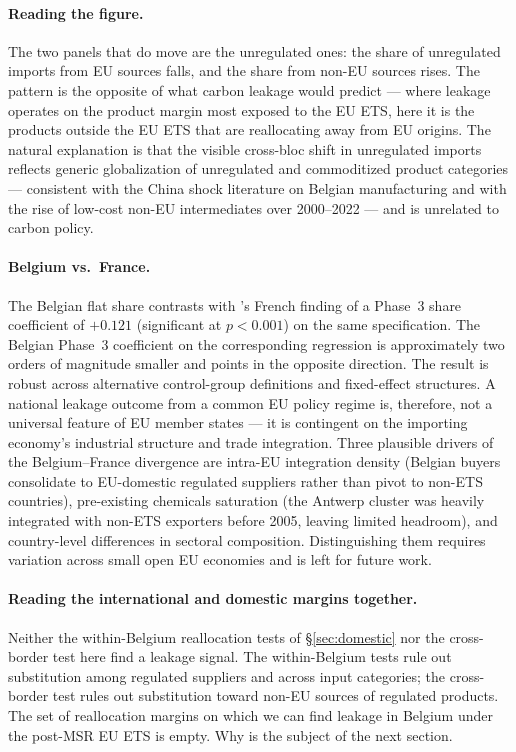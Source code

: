 \paragraph{Reading the figure.} The two panels that do move are the unregulated ones: the share of unregulated imports from EU sources falls, and the share from non-EU sources rises. The pattern is the opposite of what carbon leakage would predict --- where leakage operates on the product margin most exposed to the EU ETS, here it is the products outside the EU ETS that are reallocating away from EU origins. The natural explanation is that the visible cross-bloc shift in unregulated imports reflects generic globalization of unregulated and commoditized product categories --- consistent with the China shock literature on Belgian manufacturing and with the rise of low-cost non-EU intermediates over 2000--2022 --- and is unrelated to carbon policy.

\paragraph{Belgium vs.\ France.} The Belgian flat share contrasts with \citet{CosterMejeanDiGiovanni2024}'s French finding of a Phase~3 share coefficient of $+0.121$ (significant at $p < 0.001$) on the same specification. The Belgian Phase~3 coefficient on the corresponding regression is approximately two orders of magnitude smaller and points in the opposite direction. The result is robust across alternative control-group definitions and fixed-effect structures. A national leakage outcome from a common EU policy regime is, therefore, not a universal feature of EU member states --- it is contingent on the importing economy's industrial structure and trade integration. Three plausible drivers of the Belgium--France divergence are intra-EU integration density (Belgian buyers consolidate to EU-domestic regulated suppliers rather than pivot to non-ETS countries), pre-existing chemicals saturation (the Antwerp cluster was heavily integrated with non-ETS exporters before 2005, leaving limited headroom), and country-level differences in sectoral composition. Distinguishing them requires variation across small open EU economies and is left for future work.

\paragraph{Reading the international and domestic margins together.} Neither the within-Belgium reallocation tests of \S\ref{sec:domestic} nor the cross-border test here find a leakage signal. The within-Belgium tests rule out substitution among regulated suppliers and across input categories; the cross-border test rules out substitution toward non-EU sources of regulated products. The set of reallocation margins on which we can find leakage in Belgium under the post-MSR EU ETS is empty. Why is the subject of the next section.
